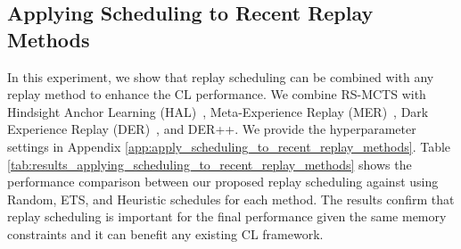 
\subsection{Applying Scheduling to Recent Replay Methods}\label{sec:applying_scheduling_to_recent_replay_methods}

In this experiment, we show that replay scheduling can be combined with any replay method to enhance the CL performance. We combine RS-MCTS with Hindsight Anchor Learning (HAL)~\cite{chaudhry2021using}, Meta-Experience Replay (MER)~\cite{riemer2018learning}, Dark Experience Replay (DER)~\cite{buzzega2020dark}, and DER++. We provide the hyperparameter settings in Appendix \ref{app:apply_scheduling_to_recent_replay_methods}. Table \ref{tab:results_applying_scheduling_to_recent_replay_methods} shows the performance comparison between our proposed replay scheduling against using Random, ETS, and Heuristic schedules for each method. The results confirm that replay scheduling %
is important for the final performance given the same memory constraints and it can benefit any existing CL framework. 


